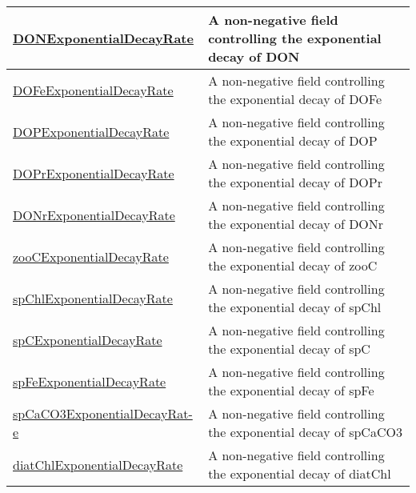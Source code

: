 {\begin{center}
\begin{longtable}{| p{2.0in} | p{4.0in} |}
    \hline
    \hyperref[subsec:var_sec_tracersExponentialDecayFields_DONExponentialDecayRate]{DONExponentialDecayRate} & A non-negative field controlling the exponential decay of DON \\
    \hline
    \hyperref[subsec:var_sec_tracersExponentialDecayFields_DOFeExponentialDecayRate]{DOFeExponentialDecayRate} & A non-negative field controlling the exponential decay of DOFe \\
    \hline
    \hyperref[subsec:var_sec_tracersExponentialDecayFields_DOPExponentialDecayRate]{DOPExponentialDecayRate} & A non-negative field controlling the exponential decay of DOP \\
    \hline
    \hyperref[subsec:var_sec_tracersExponentialDecayFields_DOPrExponentialDecayRate]{DOPrExponentialDecayRate} & A non-negative field controlling the exponential decay of DOPr \\
    \hline
    \hyperref[subsec:var_sec_tracersExponentialDecayFields_DONrExponentialDecayRate]{DONrExponentialDecayRate} & A non-negative field controlling the exponential decay of DONr \\
    \hline
    \hyperref[subsec:var_sec_tracersExponentialDecayFields_zooCExponentialDecayRate]{zooCExponentialDecayRate} & A non-negative field controlling the exponential decay of zooC \\
    \hline
    \hyperref[subsec:var_sec_tracersExponentialDecayFields_spChlExponentialDecayRate]{spChlExponentialDecayRate} & A non-negative field controlling the exponential decay of spChl \\
    \hline
    \hyperref[subsec:var_sec_tracersExponentialDecayFields_spCExponentialDecayRate]{spCExponentialDecayRate} & A non-negative field controlling the exponential decay of spC \\
    \hline
    \hyperref[subsec:var_sec_tracersExponentialDecayFields_spFeExponentialDecayRate]{spFeExponentialDecayRate} & A non-negative field controlling the exponential decay of spFe \\
    \hline
    \hyperref[subsec:var_sec_tracersExponentialDecayFields_spCaCO3ExponentialDecayRate]{spCaCO3ExponentialDecayRat-}\hyperref[subsec:var_sec_tracersExponentialDecayFields_spCaCO3ExponentialDecayRate]{e}  & A non-negative field controlling the exponential decay of spCaCO3 \\
    \hline
    \hyperref[subsec:var_sec_tracersExponentialDecayFields_diatChlExponentialDecayRate]{diatChlExponentialDecayRate} & A non-negative field controlling the exponential decay of diatChl \\

\end{longtable}
\end{center}}
